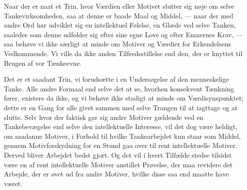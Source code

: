 \documentclass[12pt,a4paper]{book}
\newcommand{\apage}[1]{\marginnote{\footnotesize\textit{[#1]}}}
\begin{document}
\apage{22} Naar der er naat et Trin, hvor Værdien eller Motivet slutter sig nøje
om selve Tankevirksomheden, saa at denne er baade Maal og Middel, ---
naar der med andre Ord har udviklet sig en intellektuel Følelse, en
Glæde ved selve Tanken, saaledes som denne udfolder sig efter sine egne
Love og efter Emnernes Krav, --- saa behøve vi ikke særligt at minde
om Motiver og Værdier for Erkendelsens Vedkommende. Vi ville da ikke
anden Tilfredsstillelse end den, der er knyttet til Brugen af vor
Tænkeevne.

Det er et saadant Trin, vi forudsætte i en Undersøgelse af den
menneskelige Tanke. Alle andre Formaal end selve det at se, hvorhen
konsekvent Tænkning fører, existere da ikke, og vi behøve ikke stadigt
at minde om Værdisynspunktet; dette er en Gang for alle givet sammen
med selve Trangen til at iagttage og at slutte. Selv hvor der
faktisk gør sig andre Motiver gældende ved en Tankebevægelse end selve
den intellektuelle Interesse, vil det dog være heldigt, om saadanne
Motiver, i Forhold til hvilke Tankearbejdet kun staar som Middel,
gennem Motivforskydning for en Stund gaa over til rent intellektuelle
Motiver. Derved bliver Arbejdet bedst gjort. Og det vil i hvert
Tilfælde stedse tilsidst være en af rent intellektuelle Motiver
anstillet Prøvelse, der maa revidere det Arbejde, der er øvet ud fra
andre Motiver, hvilke disse saa end maatte have været.
\end{document}
